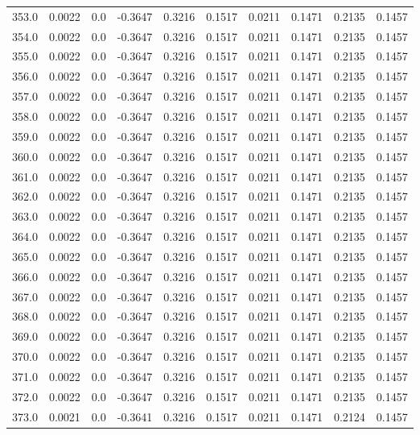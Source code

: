 \begin{longtable}{lrrrrrrrrr}
353.0 & 0.0022 & 0.0 & -0.3647 & 0.3216 & 0.1517 & 0.0211 & 0.1471 & 0.2135 & 0.1457 \\
354.0 & 0.0022 & 0.0 & -0.3647 & 0.3216 & 0.1517 & 0.0211 & 0.1471 & 0.2135 & 0.1457 \\
355.0 & 0.0022 & 0.0 & -0.3647 & 0.3216 & 0.1517 & 0.0211 & 0.1471 & 0.2135 & 0.1457 \\
356.0 & 0.0022 & 0.0 & -0.3647 & 0.3216 & 0.1517 & 0.0211 & 0.1471 & 0.2135 & 0.1457 \\
357.0 & 0.0022 & 0.0 & -0.3647 & 0.3216 & 0.1517 & 0.0211 & 0.1471 & 0.2135 & 0.1457 \\
358.0 & 0.0022 & 0.0 & -0.3647 & 0.3216 & 0.1517 & 0.0211 & 0.1471 & 0.2135 & 0.1457 \\
359.0 & 0.0022 & 0.0 & -0.3647 & 0.3216 & 0.1517 & 0.0211 & 0.1471 & 0.2135 & 0.1457 \\
360.0 & 0.0022 & 0.0 & -0.3647 & 0.3216 & 0.1517 & 0.0211 & 0.1471 & 0.2135 & 0.1457 \\
361.0 & 0.0022 & 0.0 & -0.3647 & 0.3216 & 0.1517 & 0.0211 & 0.1471 & 0.2135 & 0.1457 \\
362.0 & 0.0022 & 0.0 & -0.3647 & 0.3216 & 0.1517 & 0.0211 & 0.1471 & 0.2135 & 0.1457 \\
363.0 & 0.0022 & 0.0 & -0.3647 & 0.3216 & 0.1517 & 0.0211 & 0.1471 & 0.2135 & 0.1457 \\
364.0 & 0.0022 & 0.0 & -0.3647 & 0.3216 & 0.1517 & 0.0211 & 0.1471 & 0.2135 & 0.1457 \\
365.0 & 0.0022 & 0.0 & -0.3647 & 0.3216 & 0.1517 & 0.0211 & 0.1471 & 0.2135 & 0.1457 \\
366.0 & 0.0022 & 0.0 & -0.3647 & 0.3216 & 0.1517 & 0.0211 & 0.1471 & 0.2135 & 0.1457 \\
367.0 & 0.0022 & 0.0 & -0.3647 & 0.3216 & 0.1517 & 0.0211 & 0.1471 & 0.2135 & 0.1457 \\
368.0 & 0.0022 & 0.0 & -0.3647 & 0.3216 & 0.1517 & 0.0211 & 0.1471 & 0.2135 & 0.1457 \\
369.0 & 0.0022 & 0.0 & -0.3647 & 0.3216 & 0.1517 & 0.0211 & 0.1471 & 0.2135 & 0.1457 \\
370.0 & 0.0022 & 0.0 & -0.3647 & 0.3216 & 0.1517 & 0.0211 & 0.1471 & 0.2135 & 0.1457 \\
371.0 & 0.0022 & 0.0 & -0.3647 & 0.3216 & 0.1517 & 0.0211 & 0.1471 & 0.2135 & 0.1457 \\
372.0 & 0.0022 & 0.0 & -0.3647 & 0.3216 & 0.1517 & 0.0211 & 0.1471 & 0.2135 & 0.1457 \\
373.0 & 0.0021 & 0.0 & -0.3641 & 0.3216 & 0.1517 & 0.0211 & 0.1471 & 0.2124 & 0.1457 \\

\end{longtable}
